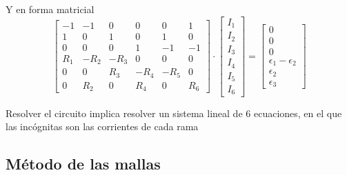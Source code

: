 \documentclass[aspectratio=169, xcolor={usenames,svgnames,dvipsnames}]{beamer}
\begin{document}
\begin{frame}{Y en forma matricial}
\begin{equation*}
  \begin{bmatrix}
    -1 & -1 & 0 & 0 & 0 & 1\\
    1 & 0 & 1 & 0 & 1 & 0\\
    0 & 0 & 0 & 1 & -1 & -1\\
    R_1 & -R_2 & - R_3 & 0 & 0 & 0\\
    0 & 0 & R_3 & - R_4 & - R_5 & 0\\
    0 & R_2 & 0 & R_4 & 0 & R_6
  \end{bmatrix} \cdot %
  \begin{bmatrix}
    I_1\\
    I_2\\
    I_3\\
    I_4\\
    I_5\\
    I_6    
  \end{bmatrix} = %
  \begin{bmatrix}
    0\\
    0\\
    0\\
    \epsilon_1 - \epsilon_2\\
    \epsilon_2\\
    \epsilon_3
  \end{bmatrix}
\end{equation*}

Resolver el circuito implica resolver un sistema lineal de \alert{6 ecuaciones}, en el que las incógnitas son las corrientes de cada rama
\end{frame}

\subsection{Método de las mallas}
\end{document}
